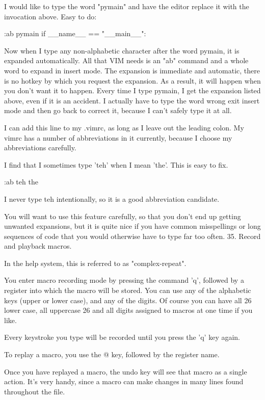 \documentclass[a4paper, 12pt]{article}
\begin{document}
      I would like to type the word "pymain" and have the editor replace it with the invocation above. Easy to do:

          :ab pymain if __name__ == "__main__": 

      Now when I type any non-alphabetic character after the word pymain, it is expanded automatically. All that VIM needs is an "ab" command and a whole word to expand in insert mode. The expansion is immediate and automatic, there is no hotkey by which you request the expansion. As a result, it will happen when you don't want it to happen. Every time I type pymain, I get the expansion listed above, even if it is an accident. I actually have to type the word wrong exit insert mode and then go back to correct it, because I can't safely type it at all.

      I can add this line to my .vimrc, as long as I leave out the leading colon. My vimrc has a number of abbreviations in it currently, because I choose my abbreviations carefully.

      I find that I sometimes type 'teh' when I mean 'the'. This is easy to fix.

          :ab teh the 

      I never type teh intentionally, so it is a good abbreviation candidate.

      You will want to use this feature carefully, so that you don't end up getting unwanted expansions, but it is quite nice if you have common misspellings or long sequences of code that you would otherwise have to type far too often.
  35. Record and playback macros.

      In the help system, this is referred to as "complex-repeat".

      You enter macro recording mode by pressing the command 'q', followed by a register into which the macro will be stored. You can use any of the alphabetic keys (upper or lower case), and any of the digits. Of course you can have all 26 lower case, all uppercase 26 and all digits assigned to macros at one time if you like.

      Every keystroke you type will be recorded until you press the 'q' key again.

      To replay a macro, you use the @ key, followed by the register name.

      Once you have replayed a macro, the undo key will see that macro as a single action. It's very handy, since a macro can make changes in many lines found throughout the file.
\end{document}
